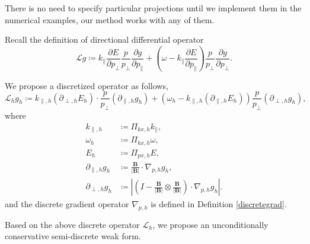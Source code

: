 \documentclass{article}
\numberwithin{equation}{section}
\begin{document}
There is no need to specify particular projections until we implement them in the numerical examples, our method works with any of them.

Recall the definition of directional differential operator
\begin{equation*}
    \mathcal{L}g\coloneqq k_{\parallel}\frac{\partial E}{\partial p_{\perp}}\frac{p}{p_{\perp}}\frac{\partial g}{\partial p_{\parallel}}+\left(\omega-k_{\parallel}\frac{\partial E}{\partial p_{\parallel}}\right)\frac{p}{p_{\perp}}\frac{\partial g}{\partial p_{\perp}}.
\end{equation*}

We propose a discretized operator as follows,
\begin{equation}\label{L_h}
   \mathcal{L}_{h}g_{h}\coloneqq k_{\parallel,h}\left(\partial_{\perp,h}E_{h}\right)\cdot\frac{p}{p_{\perp}}\left(\partial_{\parallel,h}g_{h}\right)+\left(\omega_{h}-k_{\parallel,h}\left(\partial_{\parallel,h}E_{h}\right)\right)\frac{p}{p_{\perp}}\left(\partial_{\perp,h}g_{h}\right),
\end{equation}
where 
\begin{equation*}
    \begin{split}
        k_{\parallel,h}&\coloneqq\Pi_{kx,h}k_{\parallel},\\
        \omega_{h}&\coloneqq\Pi_{kx,h}\omega,\\
        E_{h}&\coloneqq\Pi_{px,h}E,\\
        \partial_{\parallel,h}g_{h}&\coloneqq\frac{\mathbf{B}}{|\mathbf{B}|}\cdot\nabla_{p,h}g_{h},\\
        \partial_{\perp,h}g_{h}&\coloneqq\left\vert \left(I-\frac{\mathbf{B}}{|\mathbf{B}|}\otimes\frac{\mathbf{B}}{|\mathbf{B}|}\right)\cdot\nabla_{p,h}g_{h}\right\vert.
    \end{split}
\end{equation*}
and the discrete gradient operator $\nabla_{p,h}$ is defined in Definition \ref{discretegrad}.

Based on the above discrete operator $\mathcal{L}_{h}$, we propose an unconditionally conservative semi-discrete weak form.
\end{document}
